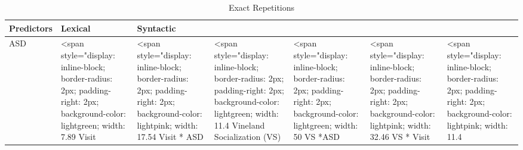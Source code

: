 \documentclass[article,30pt,extrafontsizes]{memoir}
\begin{document}
\begin{adjmulticols*}{3}{}{}
\begin{table}

\caption{\label{tab:table3}Exact Repetitions}
\centering
\begin{tabular}[t]{l|l|l}
\hline
Predictors & Lexical & Syntactic\\
\hline
ASD & <span style="display: inline-block; border-radius: 2px; padding-right: 2px; background-color: lightgreen; width: 7.89%
\hline
Visit & <span style="display: inline-block; border-radius: 2px; padding-right: 2px; background-color: lightpink; width: 17.54%
\hline
Visit * ASD & <span style="display: inline-block; border-radius: 2px; padding-right: 2px; background-color: lightgreen; width: 11.4%
\hline
Vineland Socialization (VS) & <span style="display: inline-block; border-radius: 2px; padding-right: 2px; background-color: lightgreen; width: 50%
\hline
VS *ASD & <span style="display: inline-block; border-radius: 2px; padding-right: 2px; background-color: lightpink; width: 32.46%
\hline
VS * Visit & <span style="display: inline-block; border-radius: 2px; padding-right: 2px; background-color: lightpink; width: 11.4%

\end{tabular}
\end{table}
\end{adjmulticols*}
\end{document}
